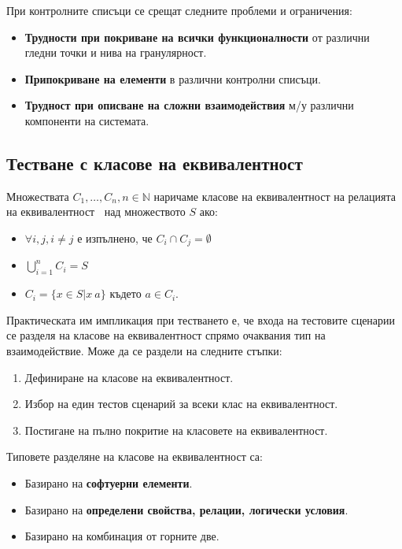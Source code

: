 \documentclass[fleqn,12pt]{article}
\begin{document}
При контролните списъци се срещат следните проблеми и ограничения:
\begin{itemize}
    \item \textbf{Трудности при покриване на всички функционалности} от различни гледни точки и нива на гранулярност.
    \item \textbf{Припокриване на елементи} в различни контролни списъци.
    \item \textbf{Трудност при описване на сложни взаимодействия} м/у различни компоненти на системата.
\end{itemize}

\subsection{Тестване с класове на еквивалентност}

Множествата $C_1, \dots, C_n, n \in \mathbb{N}$ наричаме класове на еквивалентност на релацията на еквивалентност $~$ над множеството $S$ ако:
\begin{itemize}
    \item $\forall i, j, i \neq j$ е изпълнено, че $C_i \cap C_j = \emptyset$
    \item $\bigcup\limits_{i=1}^{n} C_i = S$
    \item $C_i = \{x \in S | x ~ a\}$ където $a \in C_i$.
\end{itemize}

Практическата им импликация при тестването е, че входа на тестовите сценарии се разделя на класове на еквивалентност спрямо очаквания тип на взаимодействие.
Може да се раздели на следните стъпки:
\begin{enumerate}
    \item Дефиниране на класове на еквивалентност.
    \item Избор на един тестов сценарий за всеки клас на еквивалентност.
    \item Постигане на пълно покритие на класовете на еквивалентност.
\end{enumerate}

Типовете разделяне на класове на еквивалентност са:
\begin{itemize}
    \item Базирано на \textbf{софтуерни елементи}.
    \item Базирано на \textbf{определени свойства, релации, логически условия}.
    \item Базирано на комбинация от горните две.
\end{itemize}
\end{document}
